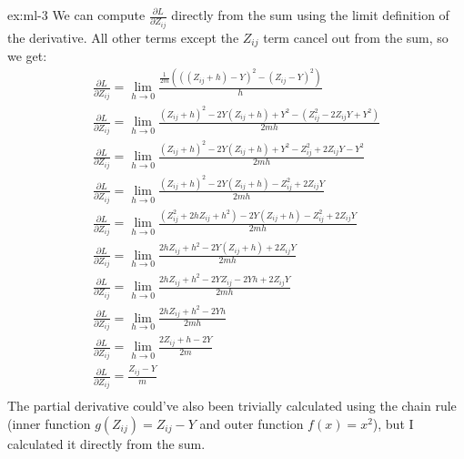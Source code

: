 \begin{solution}{ex:ml-3}
  We can compute $\frac{\partial L}{\partial Z_{ij}}$ directly from the sum using the limit definition of the derivative. All other terms except the $Z_{ij}$ term cancel out from the sum, so we get:
  \[
    \begin{gathered}
      \frac{\partial L}{\partial Z_{ij}}=\lim_{h\to 0}\frac{\frac{1}{2m}(((Z_{ij}+h)-Y)^2-(Z_{ij}-Y)^2)}{h}\\
      \frac{\partial L}{\partial Z_{ij}}=\lim_{h\to 0}\frac{(Z_{ij}+h)^2-2Y(Z_{ij}+h)+Y^2- (Z_{ij}^2-2Z_{ij}Y+Y^2)}{2mh}\\
      \frac{\partial L}{\partial Z_{ij}}=\lim_{h\to 0}\frac{(Z_{ij}+h)^2-2Y(Z_{ij}+h)+Y^2- Z_{ij}^2+2Z_{ij}Y-Y^2}{2mh}\\
      \frac{\partial L}{\partial Z_{ij}}=\lim_{h\to 0}\frac{(Z_{ij}+h)^2-2Y(Z_{ij}+h)- Z_{ij}^2+2Z_{ij}Y}{2mh}\\
      \frac{\partial L}{\partial Z_{ij}}=\lim_{h\to 0}\frac{(Z_{ij}^2+2hZ_{ij}+h^2)-2Y(Z_{ij}+h)- Z_{ij}^2+2Z_{ij}Y}{2mh}\\
      \frac{\partial L}{\partial Z_{ij}}=\lim_{h\to 0}\frac{2hZ_{ij}+h^2-2Y(Z_{ij}+h)+2Z_{ij}Y}{2mh}\\
      \frac{\partial L}{\partial Z_{ij}}=\lim_{h\to 0}\frac{2hZ_{ij}+h^2-2YZ_{ij}-2Yh+2Z_{ij}Y}{2mh}\\
      \frac{\partial L}{\partial Z_{ij}}=\lim_{h\to 0}\frac{2hZ_{ij}+h^2-2Yh}{2mh}\\
      \frac{\partial L}{\partial Z_{ij}}=\lim_{h\to 0}\frac{2Z_{ij}+h-2Y}{2m}\\
      \frac{\partial L}{\partial Z_{ij}}=\frac{Z_{ij}-Y}{m}\\
    \end{gathered}
  \]
  The partial derivative could've also been trivially calculated using the chain rule (inner function $g(Z_{ij})=Z_{ij}-Y$ and outer function $f(x)=x^2$), but I calculated it directly from the sum.
\end{solution}
